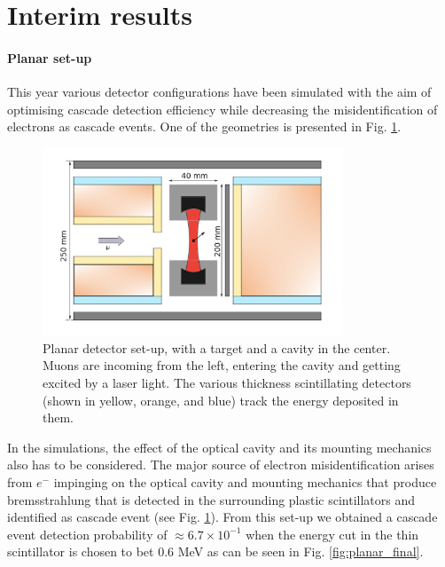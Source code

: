 \documentclass[12pt]{article}
\begin{document}


\newpage
\section{Interim results}
\paragraph{Planar set-up}
This year various detector configurations have been simulated with the aim of optimising cascade detection efficiency while decreasing the misidentification of electrons as cascade events. One of the geometries is presented in Fig. \ref{fig:setup}.
\begin{figure}[!htbp]
\centering
\includegraphics[width=0.8\textwidth]{img/setup4.png}
\caption{Planar detector set-up, with a target and a cavity in the center. Muons are incoming from the left, entering the cavity and getting excited by a laser light. The various thickness scintillating detectors (shown in yellow, orange, and blue) track the energy deposited in them.}
\label{fig:setup}
\end{figure}
In the simulations, the effect of the optical cavity and its mounting mechanics also has to be considered. The major source of electron misidentification arises from $e^-$ impinging on the optical cavity and mounting mechanics that produce bremsstrahlung that is detected in the surrounding plastic scintillators and identified as cascade event (see Fig. \ref{fig:setup}). From this set-up we obtained a cascade event detection probability of $\approx 6.7 \times 10^{-1}$ when the energy cut in the thin scintillator is chosen to bet $0.6$ MeV as can be seen in Fig. \ref{fig:planar_final}.
\end{document}
